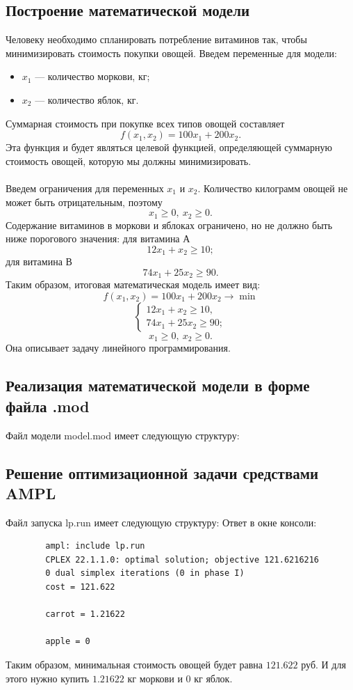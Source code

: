 \documentclass[a4paper, 12pt]{report}
\renewcommand{\geq}{\geqslant}
\begin{document}
	\subsection*{Построение математической модели}
	Человеку необходимо спланировать потребление витаминов так, чтобы минимизировать стоимость покупки овощей. Введем переменные для модели:
	\begin{itemize}
		\item $x_1$ --- количество моркови, кг;
		\item $x_2$ --- количество яблок, кг.
	\end{itemize}
	Суммарная стоимость при покупке всех типов овощей составляет $$f(x_1, x_2) = 100x_1 + 200x_2.$$
	Эта функция и будет являться целевой функцией, определяющей суммарную стоимость овощей, которую мы должны минимизировать.\\\\
	Введем ограничения для переменных $x_1$ и $x_2$. Количество килограмм овощей не может быть отрицательным, поэтому $$x_1 \geq 0,\ x_2 \geq 0.$$
	Содержание витаминов в моркови и яблоках ограничено, но не должно быть ниже порогового значения: для витамина А $$12 x_1 + x_2 \geq 10;$$
	для витамина В $$74x_1 + 25 x_2 \geq 90.$$
	Таким образом, итоговая математическая модель имеет вид:
	$$f(x_1, x_2) = 100x_1 + 200x_2 \to \min$$
	$$\begin{cases}
		12 x_1 + x_2 \geq 10,\\
		74x_1 + 25 x_2 \geq 90;
	\end{cases}$$
	$$x_1 \geq 0,\ x_2 \geq 0.$$
	Она описывает задачу линейного программирования.
	\subsection*{Реализация математической модели в форме файла .mod}
	Файл модели model.mod имеет следующую структуру:
	\subsection*{Решение оптимизационной задачи средствами AMPL}
	Файл запуска lp.run имеет следующую структуру:
	Ответ в окне консоли:
	\begin{verbatim}
		ampl: include lp.run
		CPLEX 22.1.1.0: optimal solution; objective 121.6216216
		0 dual simplex iterations (0 in phase I)
		cost = 121.622
		
		carrot = 1.21622
		
		apple = 0
	\end{verbatim}
	Таким образом, минимальная стоимость овощей будет равна $121.622$ руб. И для этого нужно купить $1.21622$ кг моркови и $0$ кг яблок.
\end{document}
